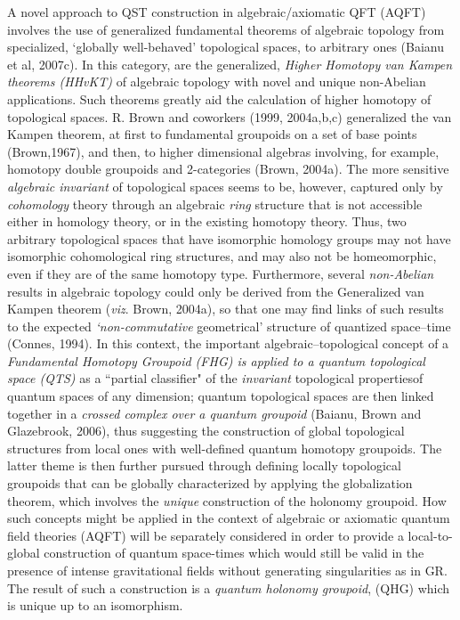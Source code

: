 \documentclass[12pt]{article}
\theoremstyle{plain}
\theoremstyle{definition}
\theoremstyle{plain}
\numberwithin{equation}{section}
\begin{document}
 A novel approach to QST construction in algebraic/axiomatic QFT (AQFT) involves the use
of generalized fundamental theorems of algebraic topology from
specialized, `globally well-behaved' topological spaces, to
arbitrary ones (Baianu et al, 2007c). In this category, are the generalized, \emph{Higher
Homotopy van Kampen theorems (HHvKT)} of algebraic topology with
novel and unique non-Abelian applications. Such theorems greatly aid
the calculation of higher homotopy of topological spaces.  R. Brown and coworkers (1999, 2004a,b,c)  generalized the van Kampen theorem, at first to fundamental  groupoids on a set of base points (Brown,1967), and
then, to higher dimensional algebras involving, for example,
homotopy double groupoids and 2-categories (Brown, 2004a). The more
sensitive \emph{algebraic invariant} of topological spaces seems to
be, however, captured only by \emph{cohomology} theory through an
algebraic \emph{ring} structure that is not accessible either in
homology theory, or in the existing homotopy theory.  Thus, two
arbitrary topological spaces that have isomorphic homology groups
may not have isomorphic cohomological ring structures, and may also
not be homeomorphic, even if they are of the same homotopy type. 
Furthermore, several \emph {non-Abelian} results in algebraic topology could only be derived from the Generalized van Kampen theorem (\emph{viz}. Brown, 2004a), so that one may find links of such results to the expected 
\emph{`non-commutative} geometrical' structure of quantized space--time
(Connes, 1994). In this context, the important algebraic--topological concept of a \emph{Fundamental Homotopy Groupoid (FHG) is applied to a quantum topological space (QTS)} as a ``partial classifier" of the \emph{invariant} topological propertiesof quantum spaces of any dimension; quantum topological
spaces are then linked together in a \emph{crossed complex over a
quantum groupoid} (Baianu, Brown and Glazebrook, 2006), thus
suggesting the construction of global topological structures from
local ones with well-defined quantum homotopy groupoids. The latter
theme is then further pursued through defining locally topological
groupoids that can be globally characterized by applying the
globalization theorem, which involves the \emph{unique} construction
of the holonomy groupoid. How such concepts might be applied in the context of algebraic or axiomatic quantum 
field theories (AQFT) will be separately considered in order to provide a local-to-global construction of quantum space-times which would still be valid in the presence of intense gravitational fields without generating singularities as in GR. The result of such a construction is a \emph{quantum holonomy groupoid}, (QHG) which is unique up to an isomorphism.
\end{document}

